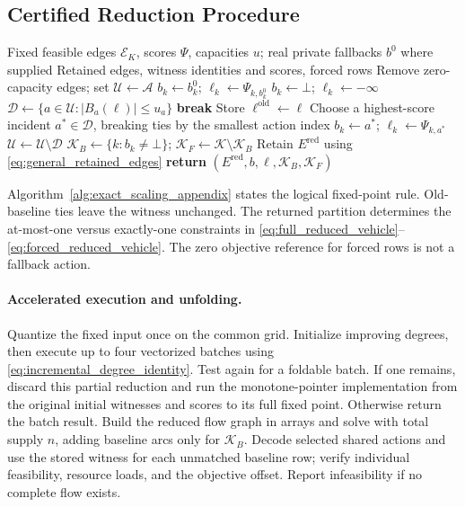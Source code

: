 \subsection{Certified Reduction Procedure}
\begin{algorithm}[t]
\caption{Exact capacity-slack graph reduction (SSG)}
\label{alg:exact_scaling_appendix}
\begin{algorithmic}[1]
\REQUIRE Fixed feasible edges $\mathcal E_K$, scores $\Psi$, capacities $u$;
real private fallbacks $b^0$ where supplied
\ENSURE Retained edges, witness identities and scores, forced rows
\STATE Remove zero-capacity edges; set $\mathcal U\gets\mathcal A$
\STATE $b_k\gets b_k^0$; $\ell_k\gets\Psi_{k,b_k^0}$
\ELSE
\STATE $b_k\gets\bot$; $\ell_k\gets-\infty$
\ENDIF
\ENDFOR
\LOOP
\STATE $\mathcal D\gets\{a\in\mathcal U:|B_a(\ell)|\le u_a\}$
\STATE \textbf{break}
\ENDIF
\STATE Store $\ell^{\mathrm{old}}\gets\ell$
\STATE Choose a highest-score incident $a^*\in\mathcal D$,
breaking ties by the smallest action index
\STATE $b_k\gets a^*$; $\ell_k\gets\Psi_{k,a^*}$
\ENDIF
\ENDFOR
\STATE $\mathcal U\gets\mathcal U\setminus\mathcal D$
\ENDLOOP
\STATE $\mathcal K_B\gets\{k:b_k\ne\bot\}$;
$\mathcal K_F\gets\mathcal K\setminus\mathcal K_B$
\STATE Retain $E^{\mathrm{red}}$ using \eqref{eq:general_retained_edges}
\STATE \textbf{return} $(E^{\mathrm{red}},b,\ell,\mathcal K_B,\mathcal K_F)$
\end{algorithmic}
\end{algorithm}
Algorithm~\ref{alg:exact_scaling_appendix} states the logical fixed-point
rule. Old-baseline ties leave the witness unchanged. The returned
partition determines the at-most-one versus exactly-one constraints
in \eqref{eq:full_reduced_vehicle}--\eqref{eq:forced_reduced_vehicle}.
The zero objective reference for forced rows is not a fallback action.

\paragraph{Accelerated execution and unfolding.}
Quantize the fixed input once on the common grid. Initialize improving
degrees, then execute up to four vectorized batches using
\eqref{eq:incremental_degree_identity}. Test again for a foldable
batch. If one remains, discard this partial reduction and run the
monotone-pointer implementation from the original initial witnesses
and scores to its full fixed point. Otherwise return the batch result.
Build the reduced flow graph in arrays and solve with total supply
$n$, adding baseline arcs only for $\mathcal K_B$. Decode selected
shared actions and use the stored witness for each unmatched baseline
row; verify individual feasibility, resource loads, and the objective
offset. Report infeasibility if no complete flow exists.

